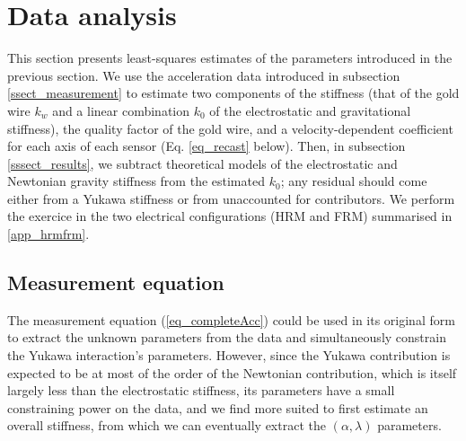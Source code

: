 \documentclass[12pt]{iopart}
\begin{document}
\section{Data analysis} \label{sect_analysis}


This section presents least-squares estimates of the parameters introduced in the previous section. We use the acceleration data introduced in subsection \ref{ssect_measurement} to estimate two components of the stiffness (that of the gold wire $k_w$ and a linear combination $k_0$ of the electrostatic and gravitational stiffness), the quality factor of the gold wire, and a velocity-dependent coefficient for each axis of each sensor (Eq. \ref{eq_recast} below). Then, in subsection \ref{sssect_results}, we subtract theoretical models of the electrostatic and Newtonian gravity stiffness from the estimated $k_0$; any residual should come either from a Yukawa stiffness or from unaccounted for contributors.
We perform the exercice in the two electrical configurations (HRM and FRM) summarised in \ref{app_hrmfrm}.

\subsection{Measurement equation} \label{ssect_anaIntro}

The measurement equation (\ref{eq_completeAcc}) could be used in its original form to extract the unknown parameters from the data and simultaneously constrain the Yukawa interaction's parameters. However, since the Yukawa contribution is expected to be at most of the order of the Newtonian contribution, which is itself largely less than the electrostatic stiffness, its parameters have a small constraining power on the data, and we find more suited to first estimate an overall stiffness, from which we can eventually extract the $(\alpha, \lambda)$ parameters.
\end{document}
